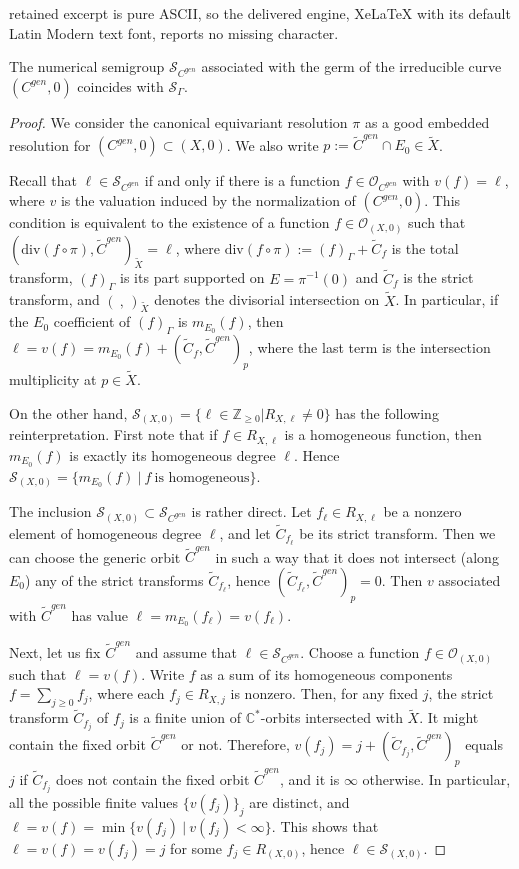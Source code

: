 \documentclass[10pt,a4paper]{amsart}
\def\cO{\mathcal{O}}
\def\cS{{\mathcal S}}
\def\div{\textrm{div}}
\begin{document}
retained excerpt is pure ASCII, so the delivered engine, XeLaTeX with its default Latin Modern text font, reports no missing character.
\begin{thm}\label{mainsmgps}
The numerical semigroup $\cS_{C^{gen}}$ associated with the germ of the irreducible curve $(C^{gen},0)$ coincides with $\cS_{\Gamma}$.   
\end{thm}

\begin{proof}
 We consider the canonical equivariant resolution $\pi$ as a good embedded resolution for $(C^{gen},0)\subset (X,0)$. We also write $p:=\tilde{C}^{gen}\cap E_0\in \tilde{X}$. 
 
 Recall that $\ell \in \cS_{C^{gen}}$ if and only if there is a function $f\in \cO_{C^{gen}}$ with $v(f)=\ell$, where $v$ is the valuation induced by the normalization of $(C^{gen},0)$. This condition is equivalent to the existence of a function $f\in \cO_{(X,0)}$ such that $(\div(f\circ \pi),\tilde C^{gen})_{\tilde{X}}=\ell$, where $\div(f\circ \pi):=(f)_{\Gamma}+\tilde C_f$ is the total transform,  $(f)_{\Gamma}$ is its part supported on $E=\pi^{-1}(0)$ and $\tilde C_f$ is the strict transform, and $(\ ,\, )_{\tilde{X}}$ denotes the divisorial intersection on $\tilde{X}$.
In particular, if the $E_0$ coefficient of $(f)_\Gamma$ is $m_{E_0}(f)$, then 
$\ell=v(f)=m_{E_0}(f)+(\tilde{C}_f, \tilde{C}^{gen})_p$, where the last term is the intersection multiplicity at $p\in\tilde{X}$. 

On the other hand, $\cS_{(X,0)}=\{\ell\in\mathbb{Z}_{\geq 0} | R_{X,\ell}\neq 0\}$ has the following reinterpretation. First note that if $f\in R_{X, \ell}$ is a homogeneous function, then 
$m_{E_0}(f)$ is exactly its homogeneous degree $\ell$. Hence  $\cS_{(X,0)}
= \{ m_{E_{0}}(f)\ |\ f \ \mbox{is homogeneous}\}$. 

The inclusion $\cS_{(X,0)}\subset  \cS_{C^{gen}}$ is rather direct. Let $f_{\ell}\in  R_{X,\ell}$
be a nonzero element of homogeneous degree $\ell$, and let $\tilde{C}_{f_{\ell}}$ be its strict transform. 
Then we can choose the generic orbit $\tilde{C}^{gen}$ in such a way that 
it does not intersect (along $E_0$) any of the strict transforms $\tilde{C}_{f_{\ell}}$, hence $(\tilde{C}_{f_{\ell}}, \tilde{C}^{gen})_p=0$.
Then $v$ associated with  $\tilde{C}^{gen}$ has value $\ell=m_{E_0}(f_\ell)=v(f_\ell)$.

Next, let us fix $\tilde{C}^{gen}$  and 
assume that $\ell\in  \cS_{C^{gen}}$. Choose  a function $f\in \cO_{(X,0)}$ such that 
$\ell=v(f)$. Write $f$ as a sum of  its homogeneous components $f=\sum _{j\geq 0} f_j$, where 
each $f_j \in R_{X,j}$ is nonzero. Then, for any fixed $j$, the strict transform $\tilde{C}_{f_j}$
of $f_j$ is a finite union of $\mathbb{C}^*$-orbits  intersected with $\tilde{X}$. 
It might contain the fixed orbit $\tilde{C}^{gen}$ or not. 
Therefore, $v(f_j)=j+(\tilde{C}_{f_j}, \tilde{C}^{gen})_p$ equals $j$ if 
$\tilde{C}_{f_j}$ does not contain the fixed orbit $\tilde{C}^{gen}$, and it is $\infty$ otherwise. 
In particular, all the possible finite values $\{v(f_j)\}_j$ are distinct, and 
$\ell=v(f)=\min \{v(f_j)\ |\  v(f_j)<\infty\}$. This shows that $\ell=v(f)=v(f_j)=j$
for some $f_j\in R_{(X,0)}$, hence $\ell\in \cS_{(X,0)} $. 
\end{proof}
\end{document}
